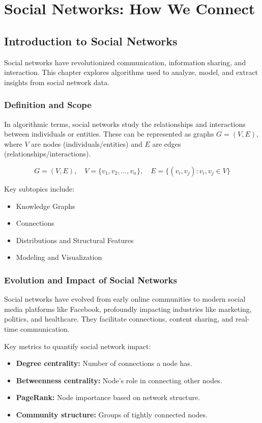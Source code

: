 \documentclass[12pt]{book} %
\begin{document}
\chapter{Social Networks: How We Connect}

\section{Introduction to Social Networks}

Social networks have revolutionized communication, information sharing, and interaction. This chapter explores algorithms used to analyze, model, and extract insights from social network data.

\subsection{Definition and Scope}

In algorithmic terms, social networks study the relationships and interactions between individuals or entities. These can be represented as graphs \(G = (V, E)\), where \(V\) are nodes (individuals/entities) and \(E\) are edges (relationships/interactions).

\[
G = (V, E), \quad V = \{v_1, v_2, \ldots, v_n\}, \quad E = \{(v_i, v_j) : v_i, v_j \in V\}
\]

Key subtopics include:

\begin{itemize}
    \item Knowledge Graphs
    \item Connections
    \item Distributions and Structural Features
    \item Modeling and Visualization
\end{itemize}

\subsection{Evolution and Impact of Social Networks}

Social networks have evolved from early online communities to modern social media platforms like Facebook, profoundly impacting industries like marketing, politics, and healthcare. They facilitate connections, content sharing, and real-time communication.

Key metrics to quantify social network impact:

\begin{itemize}
    \item \textbf{Degree centrality:} Number of connections a node has.
    \item \textbf{Betweenness centrality:} Node’s role in connecting other nodes.
    \item \textbf{PageRank:} Node importance based on network structure.
    \item \textbf{Community structure:} Groups of tightly connected nodes.
\end{itemize}
\end{document}
